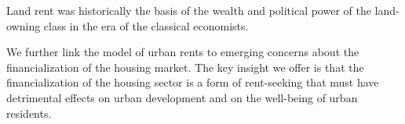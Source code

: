 Land rent was historically the basis of the wealth and political power of  the land-owning class in the era of the classical economists. %


We further link the model of urban rents to emerging concerns about the financialization of the housing market. The key insight we offer is that the financialization  of the housing sector is a  form of rent-seeking that must have detrimental effects on urban development and on the well-being of urban residents.







